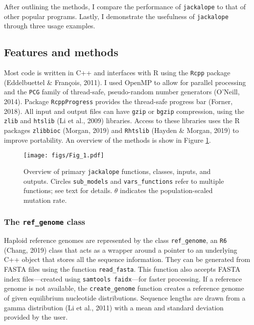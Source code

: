 \documentclass[12pt,]{article}
\begin{document}
After outlining the methods, I compare the performance of \texttt{jackalope} to that of
other popular programs.
Lastly, I demonstrate the usefulness of \texttt{jackalope} through three usage examples.

\hypertarget{features-and-methods}{%
\subsection{Features and methods}\label{features-and-methods}}

Most code is written in C++ and interfaces with R using the \texttt{Rcpp} package
(Eddelbuettel \& François, 2011).
I used OpenMP to allow for parallel processing and
the \texttt{PCG} family of thread-safe, pseudo-random number generators
(O'Neill, 2014).
Package \texttt{RcppProgress} provides the thread-safe progress bar
(Forner, 2018).
All input and output files can have \texttt{gzip} or \texttt{bgzip} compression, using the
\texttt{zlib} and
\texttt{htslib}
(Li et al., 2009)
libraries.
Access to these libraries uses the R packages
\texttt{zlibbioc} (Morgan, 2019) and
\texttt{Rhtslib} (Hayden \& Morgan, 2019)
to improve portability.
An overview of the methods is show in Figure \ref{fig:jackalope-overview-figure}.

\begin{figure}
\centering
\texttt{[image: figs/Fig\_1.pdf]}
\caption{\label{fig:jackalope-overview-figure}Overview of primary \texttt{jackalope} functions, classes, inputs, and outputs. Circles \texttt{sub\_models} and \texttt{vars\_functions} refer to multiple functions; see text for details. \(\theta\) indicates the population-scaled mutation rate.}
\end{figure}

\hypertarget{the-ref_genome-class}{%
\subsubsection{\texorpdfstring{The \texttt{ref\_genome} class}{The ref\_genome class}}\label{the-ref_genome-class}}

Haploid reference genomes are represented by the class \texttt{ref\_genome}, an
\texttt{R6} (Chang, 2019)
class that acts as a wrapper around a pointer to
an underlying C++ object that stores all the sequence information.
They can be generated from FASTA files using the function \texttt{read\_fasta}.
This function also accepts FASTA index files---created using
\texttt{samtools\ faidx}---for faster processing.
If a reference genome is not available, the \texttt{create\_genome} function creates
a reference genome of given equilibrium nucleotide distributions.
Sequence lengths are drawn from a gamma distribution
(Li et al., 2011)
with a mean and standard deviation provided by the user.
\end{document}
